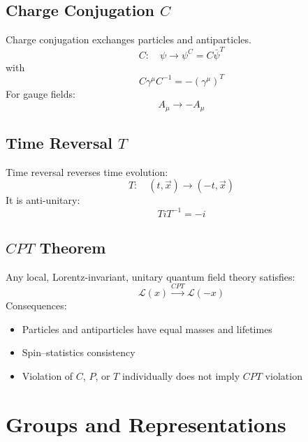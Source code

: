 \documentclass{article}
\begin{document}
\subsection{Charge Conjugation $C$}
Charge conjugation exchanges particles and antiparticles.
\begin{equation*}
    C:\quad \psi \rightarrow \psi^C = C \bar{\psi}^T
\end{equation*}
with
\begin{equation*}
    C\gamma^\mu C^{-1} = -(\gamma^\mu)^T
\end{equation*}
For gauge fields:
\begin{equation*}
    A_\mu \rightarrow -A_\mu
\end{equation*}
\subsection{Time Reversal $T$}
Time reversal reverses time evolution:
\begin{equation*}
    T:\quad (t,\vec{x}) \rightarrow (-t,\vec{x})
\end{equation*}
It is anti-unitary:
\begin{equation*}
    T i T^{-1} = -i
\end{equation*}
\subsection{$CPT$ Theorem}
Any local, Lorentz-invariant, unitary quantum field theory satisfies:
\begin{equation*}
    \mathcal{L}(x) \xrightarrow{CPT} \mathcal{L}(-x)
\end{equation*}
Consequences:
\begin{itemize}
    \item Particles and antiparticles have equal masses and lifetimes
    \item Spin–statistics consistency
    \item Violation of $C$, $P$, or $T$ individually does not imply $CPT$ violation
\end{itemize}


\section{Groups and Representations}
\end{document}
